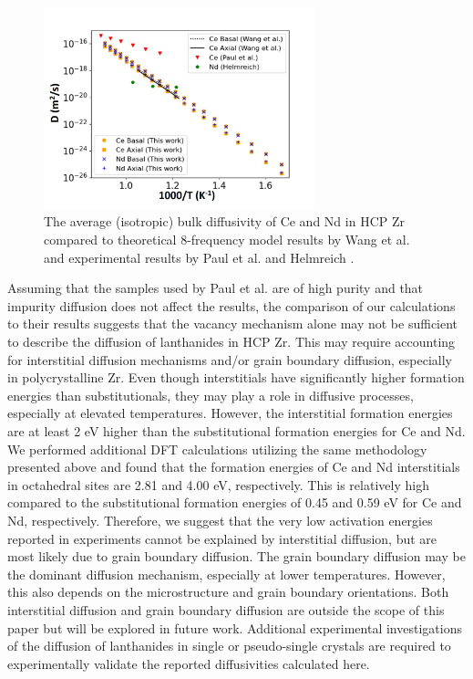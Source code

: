 \documentclass[preprint,12pt]{elsarticle}
\begin{document}
\begin{figure}[h!]
    \centering
    \includegraphics[width=0.7\textwidth]{8_ce_nd_diff_exp_8freq.jpg}
    \caption{The average (isotropic) bulk diffusivity of Ce and Nd in HCP Zr compared to theoretical 8-frequency model results by Wang et al. \cite{wang_first_2019} and experimental results by Paul et al. \cite{paul_diffusion_1968} and Helmreich \cite{helmreich_diffusion_2014}. }
    \label{fig:ce_nd_exp}
\end{figure}

Assuming that the samples used by Paul et al. \cite{paul_diffusion_1968} are of high purity and that impurity diffusion does not affect the results, the comparison of our calculations to their results suggests that the vacancy mechanism alone may not be sufficient to describe the diffusion of lanthanides in HCP Zr. This may require accounting for interstitial diffusion mechanisms and/or grain boundary diffusion, especially in polycrystalline Zr. Even though interstitials have significantly higher formation energies than substitutionals, they may play a role in diffusive processes, especially at elevated temperatures. However, the interstitial formation energies are at least 2 eV higher than the substitutional formation energies for Ce and Nd. We performed additional DFT calculations utilizing the same methodology presented above and found that the formation energies of Ce and Nd interstitials in octahedral sites are 2.81 and 4.00 eV, respectively. This is relatively high compared to the substitutional formation energies of 0.45 and 0.59 eV for Ce and Nd, respectively. Therefore, we suggest that the very low activation energies reported in experiments \cite{paul_diffusion_1968} cannot be explained by interstitial diffusion, but are most likely due to grain boundary diffusion. The grain boundary diffusion may be the dominant diffusion mechanism, especially at lower temperatures. However, this also depends on the microstructure and grain boundary orientations. Both interstitial diffusion and grain boundary diffusion are outside the scope of this paper but will be explored in future work. Additional experimental investigations of the diffusion of lanthanides in single or pseudo-single crystals are required to experimentally validate the reported diffusivities calculated here.
\end{document}
